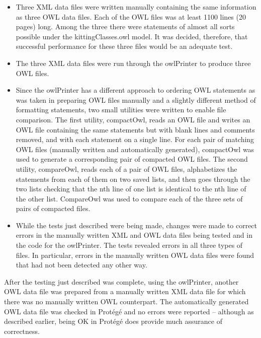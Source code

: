 \begin{itemize}
\item Three XML data files were written manually containing the same
  information as three OWL data files. Each of the OWL files was at least
  1100 lines (20 pages) long. Among the three there were statements of
  almost all sorts possible under the kittingClasses.owl model. It was
  decided, therefore, that successful performance for these three files
  would be an adequate test.
\item The three XML data files were run through the owlPrinter to produce
  three OWL files.
\item Since the owlPrinter has a different approach to ordering OWL
  statements as was taken in preparing OWL files manually and a slightly
  different method of formatting statements, two small utilities were
  written to enable file comparison. The first utility, compactOwl, reads
  an OWL file and writes an OWL file containing the same statements but
  with blank lines and comments removed, and with each statement on a
  single line. For each pair of matching OWL files (manually written and
  automatically generated), compactOwl was used to generate a corresponding
  pair of compacted OWL files. The second utility, compareOwl, reads each
  of a pair of OWL files, alphabetizes the statements from each of them on
  two saved lists, and then goes through the two lists checking that the
  nth line of one list is identical to the nth line of the other list.
  CompareOwl was used to compare each of the three sets of pairs of
  compacted files.
\item While the tests just described were being made, changes were made to
  correct errors in the manually written XML and OWL data files being
  tested and in the code for the owlPrinter. The tests revealed errors in
  all three types of files. In particular, errors in the manually written
  OWL data files were found that had not been detected any other way.
\end{itemize}

After the testing just described was complete, using the owlPrinter,
another OWL data file was prepared from a manually written XML data file
for which there was no manually written OWL counterpart. The automatically
generated OWL data file was checked in  Prot\'{e}g\'{e} and no errors were reported
-- although as described earlier, being OK in  Prot\'{e}g\'{e} does provide much
assurance of correctness.

